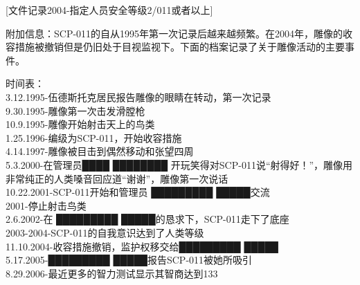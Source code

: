 [文件记录2004-指定人员安全等级2\slash011或者以上]

附加信息：SCP-011的自从1995年第一次记录后越来越频繁。在2004年，雕像的收容措施被撤销但是仍旧处于目视监视下。下面的档案记录了关于雕像活动的主要事件。

\begin{scpbox}

时间表：\\
3.12.1995-伍德斯托克居民报告雕像的眼睛在转动，第一次记录\\
9.30.1995-雕像第一次击发滑膛枪\\
10.9.1995-雕像开始射击天上的鸟类\\
1.25.1996-编级为SCP-011，开始收容措施\\
4.14.1997-雕像被目击到偶然移动和张望四周\\
5.3.2000-在管理员████ ████████ 开玩笑得对SCP-011说“射得好！”，雕像用非常纯正的人类嗓音回应道“谢谢”，雕像第一次说话\\
10.22.2001-SCP-011开始和管理员 █████████ █████交流\\
2001-停止射击鸟类\\
2.6.2002-在 █████████ █████的恳求下，SCP-011走下了底座\\
2003-2004-SCP-011的自我意识达到了人类等级\\
11.10.2004-收容措施撤销，监护权移交给█████████ █████\\
5.17.2005-█████████ █████报告SCP-011被她所吸引\\
8.29.2006-最近更多的智力测试显示其智商达到133

\end{scpbox}
